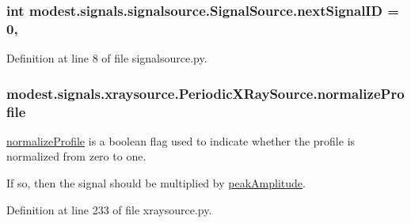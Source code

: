\subsubsection[{\texorpdfstring{next\+Signal\+ID}{nextSignalID}}]{\setlength{\rightskip}{0pt plus 5cm}int modest.\+signals.\+signalsource.\+Signal\+Source.\+next\+Signal\+ID = 0\hspace{0.3cm}{\ttfamily [static]}, {\ttfamily [inherited]}}\hypertarget{classmodest_1_1signals_1_1signalsource_1_1SignalSource_a453eafb550b551adbec0903deb63dfce}{}\label{classmodest_1_1signals_1_1signalsource_1_1SignalSource_a453eafb550b551adbec0903deb63dfce}


Definition at line 8 of file signalsource.\+py.

\subsubsection[{\texorpdfstring{normalize\+Profile}{normalizeProfile}}]{\setlength{\rightskip}{0pt plus 5cm}modest.\+signals.\+xraysource.\+Periodic\+X\+Ray\+Source.\+normalize\+Profile}\hypertarget{classmodest_1_1signals_1_1xraysource_1_1PeriodicXRaySource_ac7490bebcc1d508b7813ea274cc36702}{}\label{classmodest_1_1signals_1_1xraysource_1_1PeriodicXRaySource_ac7490bebcc1d508b7813ea274cc36702}


\hyperlink{classmodest_1_1signals_1_1xraysource_1_1PeriodicXRaySource_ac7490bebcc1d508b7813ea274cc36702}{normalize\+Profile} is a boolean flag used to indicate whether the profile is normalized from zero to one. 

If so, then the signal should be multiplied by \hyperlink{classmodest_1_1signals_1_1xraysource_1_1PeriodicXRaySource_ab9ca2f0588f7e2f23c5301e05070fe99}{peak\+Amplitude}. 

Definition at line 233 of file xraysource.\+py.

